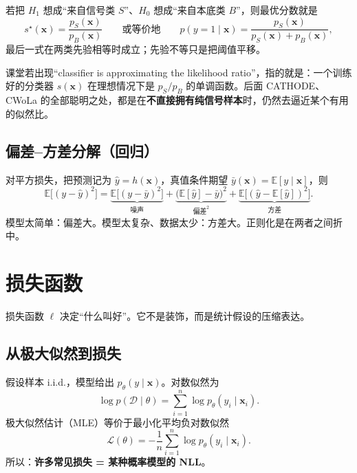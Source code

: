 \documentclass[11pt,a4paper]{article}
\theoremstyle{definition}
\theoremstyle{plain}
\theoremstyle{remark}
\newcommand{\E}{\mathbb{E}}
\newcommand{\loss}{\mathcal{L}}
\newcommand{\data}{\mathcal{D}}
\begin{document}
若把 $H_1$ 想成``来自信号类 $S$''、$H_0$ 想成``来自本底类 $B$''，则最优分数就是
\begin{equation}
  s^\star(\mathbf{x})=\frac{p_S(\mathbf{x})}{p_B(\mathbf{x})}\qquad\text{或等价地}\qquad
  p(y=1\mid\mathbf{x})=\frac{p_S(\mathbf{x})}{p_S(\mathbf{x})+p_B(\mathbf{x})},
\end{equation}
最后一式在两类先验相等时成立；先验不等只是把阈值平移。

\begin{hearbox}
课堂若出现``classifier is approximating the likelihood ratio''，指的就是：一个训练好的分类器 $s(\mathbf{x})$ 在理想情况下是 $p_S/p_B$ 的单调函数。后面 CATHODE、CWoLa 的全部聪明之处，都是在\textbf{不直接拥有纯信号样本}时，仍然去逼近某个有用的似然比。
\end{hearbox}

\subsection{偏差--方差分解（回归）}

对平方损失，把预测记为 $\hat y=h(\mathbf{x})$，真值条件期望 $\bar y(\mathbf{x})=\E[y\mid\mathbf{x}]$，则
\begin{equation}
  \E\bigl[(y-\hat y)^2\bigr]
  =\underbrace{\E\bigl[(y-\bar y)^2\bigr]}_{\text{噪声}}
  +\underbrace{\bigl(\E[\hat y]-\bar y\bigr)^2}_{\text{偏差}^2}
  +\underbrace{\E\bigl[(\hat y-\E[\hat y])^2\bigr]}_{\text{方差}}.
\end{equation}
模型太简单：偏差大。模型太复杂、数据太少：方差大。正则化是在两者之间折中。

\section{损失函数}
\label{sec:loss}

损失函数 $\ell$ 决定``什么叫好''。它不是装饰，而是统计假设的压缩表达。

\subsection{从极大似然到损失}

假设样本 i.i.d.，模型给出 $p_\theta(y\mid\mathbf{x})$。对数似然为
\begin{equation}
  \log p(\data\mid\theta)=\sum_{i=1}^n \log p_\theta(y_i\mid\mathbf{x}_i).
\end{equation}
极大似然估计（MLE）等价于最小化平均负对数似然
\begin{equation}
  \loss(\theta)=-\frac{1}{n}\sum_{i=1}^n \log p_\theta(y_i\mid\mathbf{x}_i).
\end{equation}
所以：\textbf{许多常见损失 = 某种概率模型的 NLL}。
\end{document}
